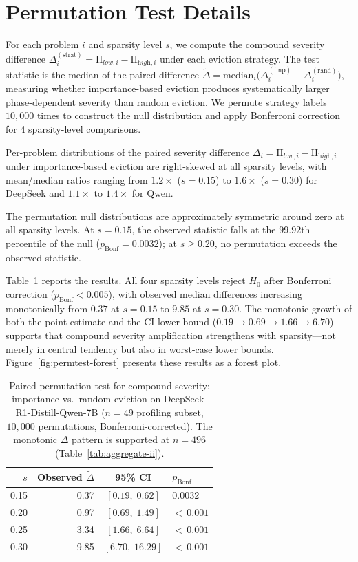 \section{Permutation Test Details}
\label{app:permutation-details}

For each problem $i$ and sparsity level $s$, we compute the compound severity difference $\Delta_i^{(\text{strat})} = \mathrm{II}_{\textit{low},i} - \mathrm{II}_{\textit{high},i}$ under each eviction strategy. The test statistic is the median of the paired difference $\widetilde{\Delta} = \text{median}_i\!\bigl(\Delta_i^{(\text{imp})} - \Delta_i^{(\text{rand})}\bigr)$, measuring whether importance-based eviction produces systematically larger phase-dependent severity than random eviction. We permute strategy labels $10{,}000$ times to construct the null distribution and apply Bonferroni correction for 4 sparsity-level comparisons.

Per-problem distributions of the paired severity difference $\Delta_i = \mathrm{II}_{\textit{low},i} - \mathrm{II}_{\textit{high},i}$ under importance-based eviction are right-skewed at all sparsity levels, with mean/median ratios ranging from $1.2{\times}$ ($s{=}0.15$) to $1.6{\times}$ ($s{=}0.30$) for DeepSeek and $1.1{\times}$ to $1.4{\times}$ for Qwen.

The permutation null distributions are approximately symmetric around zero at all sparsity levels. At $s{=}0.15$, the observed statistic falls at the $99.92$th percentile of the null ($p_{\text{Bonf}} = 0.0032$); at $s \geq 0.20$, no permutation exceeds the observed statistic.

Table~\ref{tab:permutation} reports the results. All four sparsity levels reject $H_0$ after Bonferroni correction ($p_{\text{Bonf}} < 0.005$), with observed median differences increasing monotonically from $0.37$ at $s{=}0.15$ to $9.85$ at $s{=}0.30$. The monotonic growth of both the point estimate and the CI lower bound ($0.19 \to 0.69 \to 1.66 \to 6.70$) supports that compound severity amplification strengthens with sparsity---not merely in central tendency but also in worst-case lower bounds. Figure~\ref{fig:permtest-forest} presents these results as a forest plot.

\begin{table}[t]
\centering
\small
\caption{Paired permutation test for compound severity: importance vs.\ random eviction on DeepSeek-R1-Distill-Qwen-7B ($n{=}49$ profiling subset, $10{,}000$ permutations, Bonferroni-corrected). The monotonic $\Delta$ pattern is supported at $n{=}496$ (Table~\ref{tab:aggregate-ii}).}
\label{tab:permutation}
\begin{tabular}{@{}rrcl@{}}
\toprule
$s$ & Observed $\widetilde{\Delta}$ & 95\% CI & $p_{\text{Bonf}}$ \\
\midrule
0.15 & 0.37 & $[0.19,\; 0.62]$ & 0.0032 \\
0.20 & 0.97 & $[0.69,\; 1.49]$ & ${<}\,0.001$ \\
0.25 & 3.34 & $[1.66,\; 6.64]$ & ${<}\,0.001$ \\
0.30 & 9.85 & $[6.70,\; 16.29]$ & ${<}\,0.001$ \\
\bottomrule
\end{tabular}
\end{table}

